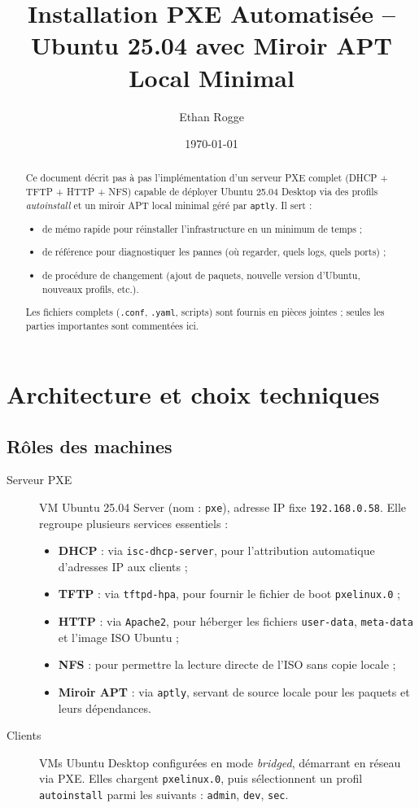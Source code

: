 \documentclass[a4paper,12pt]{article}
\title{Installation PXE Automatisée – Ubuntu 25.04 avec Miroir APT Local Minimal}
\author{Ethan Rogge}
\date{\today}
\begin{document}
\maketitle

\begin{abstract}
Ce document décrit pas à pas l’implémentation d’un serveur PXE complet (DHCP + TFTP + HTTP + NFS) capable de déployer Ubuntu 25.04 Desktop via des profils \emph{autoinstall} et un miroir APT local minimal géré par \texttt{aptly}. Il sert :
\begin{itemize}
\item de mémo rapide pour réinstaller l’infrastructure en un minimum de temps ;
\item de référence pour diagnostiquer les pannes (où regarder, quels logs, quels ports) ;
\item de procédure de changement (ajout de paquets, nouvelle version d’Ubuntu, nouveaux profils, etc.).
\end{itemize}
Les fichiers complets (\texttt{.conf}, \texttt{.yaml}, scripts) sont fournis en pièces jointes ; seules les parties importantes sont commentées ici.
\end{abstract}

\section{Architecture et choix techniques}
\subsection{Rôles des machines}
\begin{description}
  \item[Serveur PXE] VM Ubuntu 25.04 Server (nom : \texttt{pxe}), adresse IP fixe \texttt{192.168.0.58}. Elle regroupe plusieurs services essentiels :
  \begin{itemize}
    \item \textbf{DHCP} : via \texttt{isc-dhcp-server}, pour l’attribution automatique d’adresses IP aux clients ;
    \item \textbf{TFTP} : via \texttt{tftpd-hpa}, pour fournir le fichier de boot \texttt{pxelinux.0} ;
    \item \textbf{HTTP} : via \texttt{Apache2}, pour héberger les fichiers \texttt{user-data}, \texttt{meta-data} et l’image ISO Ubuntu ;
    \item \textbf{NFS} : pour permettre la lecture directe de l’ISO sans copie locale ;
    \item \textbf{Miroir APT} : via \texttt{aptly}, servant de source locale pour les paquets et leurs dépendances.
  \end{itemize}

  \item[Clients] VMs Ubuntu Desktop configurées en mode \emph{bridged}, démarrant en réseau via PXE. Elles chargent \texttt{pxelinux.0}, puis sélectionnent un profil \texttt{autoinstall} parmi les suivants : \texttt{admin}, \texttt{dev}, \texttt{sec}.
\end{description}
\end{document}

